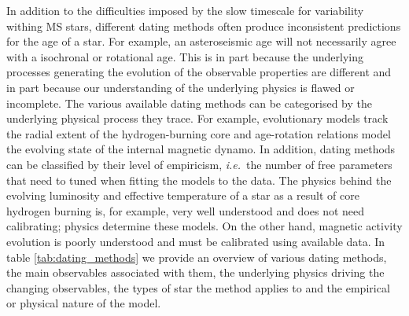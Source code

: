 \documentclass[useAMS, usenatbib, preprint, 12pt]{aastex}
\newcommand{\ie}{{\it i.e.}}
\begin{document}
In addition to the difficulties imposed by the slow timescale for variability
withing MS stars, different dating methods often produce inconsistent
predictions for the age of a star.
For example, an asteroseismic age will not necessarily agree with a isochronal
or rotational age.
This is in part because the underlying processes generating the evolution of
the observable properties are different and in part because our understanding
of the underlying physics is flawed or incomplete.
The various available dating methods can be categorised by the underlying
physical process they trace.
For example, evolutionary models track the radial extent of the
hydrogen-burning core and age-rotation relations model the evolving state of
the internal magnetic dynamo.
In addition, dating methods can be classified by their level of empiricism,
\ie\ the number of free parameters that need to tuned when fitting the models
to the data.
The physics behind the evolving luminosity and effective temperature of a star
as a result of core hydrogen burning is, for example, very well understood and
does not need calibrating; physics determine these models.
On the other hand, magnetic activity evolution is poorly understood and must
be calibrated using available data.
In table \ref{tab:dating_methods} we provide an overview of various dating
methods, the main observables associated with them, the underlying physics
driving the changing observables, the types of star the method applies to and
the empirical or physical nature of the model.
\end{document}
